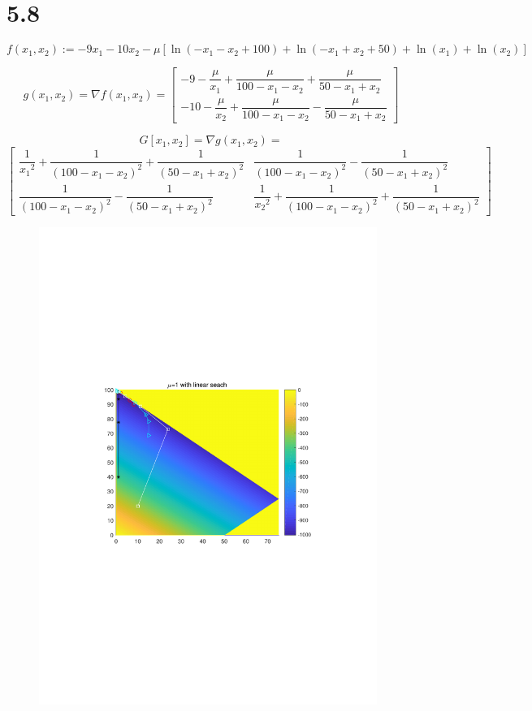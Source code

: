 \section{5.8}
\[f({x_1},{x_2}){:=}-9{x_1}-10{x_2}-\mu \left[\ln(-{x_1}-{x_2}+100)+\ln (-{x_1}+{x_2}+50)+\ln ({x_1})+\ln ({x_2})\right]\]

\[
g(x_1, x_2) = \nabla f(x_1, x_2)=
\begin{bmatrix}
-9 -\dfrac{\mu}{x_1 }+\dfrac{\mu}{100 - x_1 - x_2} + \dfrac{\mu}{50 - x_1 + x_2} \\
-10 - \dfrac{\mu}{x_2 }+\dfrac{\mu}{100 - x_1 - x_2} - \dfrac{\mu}{50 - x_1 + x_2}
\end{bmatrix}
\]


\[G[x_1, x_2] = \nabla g(x_1, x_2)=\]
\[
\begin{bmatrix}
\dfrac{1}{{x_1}^2 }+\dfrac{1}{(100 - x_1 - x_2)^2} + \dfrac{1}{(50 - x_1 + x_2)^2} 
&\dfrac{1}{(100 - x_1 - x_2)^2} - \dfrac{1}{(50 - x_1 + x_2)^2}\\
\dfrac{1}{(100 - x_1 - x_2)^2} - \dfrac{1}{(50 - x_1 + x_2)^2}&
\dfrac{1}{{x_2}^2 }+\dfrac{1}{(100 - x_1 - x_2)^2} + \dfrac{1}{(50 - x_1 + x_2)^2} 
\end{bmatrix}
\]

\begin{figure}[H]
\centering
\includegraphics[width=11cm]{fig/5_1.pdf}
\end{figure}

